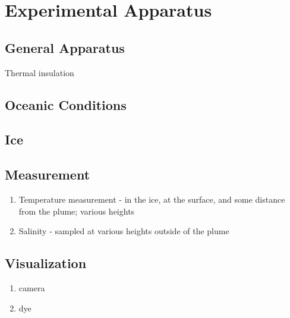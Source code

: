 \documentclass{article}
\begin{document}
\section{Experimental Apparatus}
\subsection{General Apparatus}
Thermal insulation
\subsection{Oceanic Conditions}
\subsection{Ice}
\subsection{Measurement}
\begin{enumerate}
    \item Temperature measurement - in the ice, at the surface, and some distance from the plume; various heights 
    \item Salinity - sampled at various heights outside of the plume
\end{enumerate}
\subsection{Visualization}
\begin{enumerate}
    \item camera
    \item dye
\end{enumerate}



\end{document}
